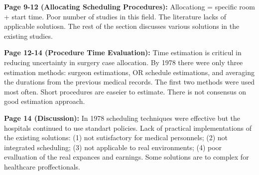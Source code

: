     \textbf{Page 9-12 (Allocating Scheduling Procedures):}
    Allocationg = specific room + start time. Poor number of studies in this field. The literature lacks of applicable solutiosn. The rest of the section discusses various solutions in the existing studies.

    \textbf{Page 12-14 (Procedure Time Evaluation):}
    Time estimation is criticul in reducing uncertainty in surgery case allocation. By 1978 there were only three estimation methods: surgeon estimations, OR schedule estimations, and averaging the durations from the previous medical records. The first two methods were used most often. Short procedures are easeier to estimate. There is not consensus on good estimation approach. 
    
    \textbf{Page 14 (Discussion):}
    In 1978 scheduling techniques were effective but the hospitals continued to use standart policies. Lack of practical implementations of the existing solutions: (1) not sutisfactory for medical personnels; (2) not integrated scheduling; (3) not applicable to real environments; (4) poor evalluation of the real expances and earnings. Some solutions are to complex for healthcare proffectionals.